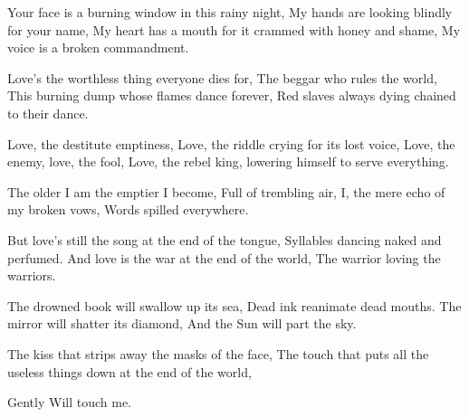 \documentclass[english,11pt,letterpaper,onecolumn]{scrbook}
\begin{document}
\begin{poem}
\begin{stanza}
Your face is a burning window in this rainy night,\verseline
My hands are looking blindly for your name,\verseline
My heart has a mouth for it crammed with honey and shame,\verseline
My voice is a broken commandment.
\end{stanza}

\begin{stanza}
Love's the worthless thing everyone dies for,\verseline
The beggar who rules the world,\verseline
This burning dump whose flames dance forever,\verseline
Red slaves always dying chained to their dance.
\end{stanza}

\begin{stanza}
Love, the destitute emptiness,\verseline
Love, the riddle crying for its lost voice,\verseline
Love, the enemy, love, the fool,\verseline
Love, the rebel king, lowering himself to serve everything.
\end{stanza}

\begin{stanza}
The older I am the emptier I become,\verseline
Full of trembling air,\verseline
I, the mere echo of my broken vows,\verseline
Words spilled everywhere.
\end{stanza}

\begin{stanza}
But love's still the song at the end of the tongue,\verseline
Syllables dancing naked and perfumed.\verseline
And love is the war at the end of the world,\verseline
The warrior loving the warriors.
\end{stanza}

\begin{stanza}
The drowned book will swallow up its sea,\verseline
Dead ink reanimate dead mouths.\verseline
The mirror will shatter its diamond,\verseline
And the Sun will part the sky.
\end{stanza}

\begin{stanza}
The kiss that strips away the masks of the face,\verseline
The touch that puts all the useless things down at the end of the world,
\end{stanza}

\begin{stanza}
Gently\verseline
Will touch me.	
\end{stanza}
\end{poem}
\end{document}
